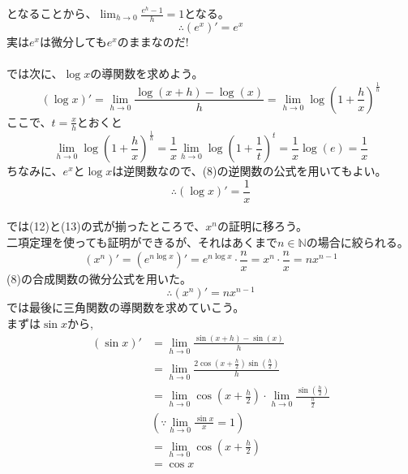 \documentclass[a4j,dvipdfmx]{jsarticle}
\begin{document}
    となることから、$\lim_{h\rightarrow0}\frac{e^{h}-1}{h}=1$となる。
    \begin{equation}
        \therefore (e^x)'=e^x
    \end{equation}
    実は$e^x$は微分しても$e^x$のままなのだ!\\\\
    では次に、$\log x$の導関数を求めよう。\\
    \begin{equation*}
        (\log x)'=\lim_{h\rightarrow0}\frac{\log(x+h)-\log(x)}{h}=\lim_{h\rightarrow0}\log(1+\frac{h}{x})^{\frac{1}{h}}
    \end{equation*}
    ここで、$t=\frac{x}{h}$とおくと\\
    \begin{equation*}
        \lim_{h\rightarrow0}\log(1+\frac{h}{x})^{\frac{1}{h}}=\frac{1}{x}\lim_{h\rightarrow0}\log(1+\frac{1}{t})^t=
        \frac{1}{x}\log(e)=\frac{1}{x}
    \end{equation*}
    ちなみに、$e^x$と$\log x$は逆関数なので、(8)の逆関数の公式を用いてもよい。\\
    \begin{equation}
        \therefore(\log x)'=\frac{1}{x}
    \end{equation}
    \\
    では(12)と(13)の式が揃ったところで、$x^n$の証明に移ろう。\\
    二項定理を使っても証明ができるが、それはあくまで$n\in\mathbb{N}$の場合に絞られる。\\
    \begin{equation*}
        (x^n)'=(e^{n\log x})'=e^{n\log x}\cdot \frac{n}{x}=x^n\cdot \frac{n}{x}=nx^{n-1}
    \end{equation*}
    (8)の合成関数の微分公式を用いた。\\
    \begin{equation}
        \therefore(x^n)'=nx^{n-1}
    \end{equation}
    では最後に三角関数の導関数を求めていこう。\\
    まずは$\sin x$から,
    \begin{align*}
        (\sin x)'&=\lim_{h\rightarrow0}\frac{\sin(x+h)-\sin(x)}{h}\\
        &=\lim_{h\rightarrow0}\frac{2\cos(x+\frac{h}{2})\sin(\frac{h}{2})}{h}\\
        &=\lim_{h\rightarrow0}\cos(x+\frac{h}{2})\cdot\lim_{h\rightarrow0}\frac{\sin(\frac{h}{2})}{\frac{h}{2}}\\
        &(\because \lim_{h\rightarrow0}\frac{\sin x}{x}=1)\\
        &=\lim_{h\rightarrow0}\cos(x+\frac{h}{2})\\
        &=\cos x
    \end{align*}
\end{document}
